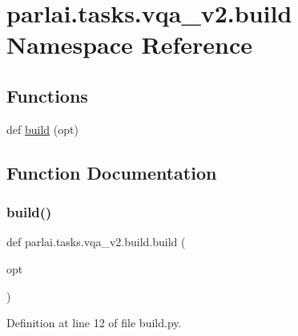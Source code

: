 \hypertarget{namespaceparlai_1_1tasks_1_1vqa__v2_1_1build}{}\section{parlai.\+tasks.\+vqa\+\_\+v2.\+build Namespace Reference}
\label{namespaceparlai_1_1tasks_1_1vqa__v2_1_1build}
\subsection*{Functions}
\begin{DoxyCompactItemize}
\item 
def \hyperlink{namespaceparlai_1_1tasks_1_1vqa__v2_1_1build_ad8bd5179304b2b092593e6876da288f9}{build} (opt)
\end{DoxyCompactItemize}


\subsection{Function Documentation}
\mbox{\label{namespaceparlai_1_1tasks_1_1vqa__v2_1_1build_ad8bd5179304b2b092593e6876da288f9}} 
\subsubsection{\texorpdfstring{build()}{build()}}
{\footnotesize\ttfamily def parlai.\+tasks.\+vqa\+\_\+v2.\+build.\+build (\begin{DoxyParamCaption}\item[{}]{opt }\end{DoxyParamCaption})}



Definition at line 12 of file build.\+py.

